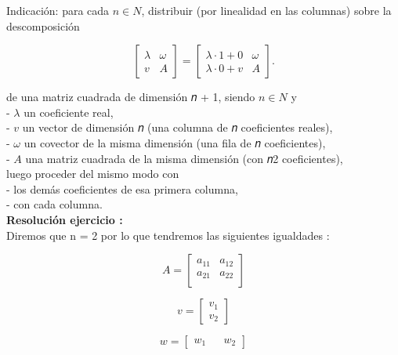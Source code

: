 \documentclass[11pt]{article}
\begin{document}
Indicación: para cada \(n ∈ N\), distribuir (por linealidad en las
columnas) sobre la descomposición

\begin{equation}
\begin{bmatrix}
\lambda & \omega \\
v & A
\end{bmatrix} = \begin{bmatrix}
\lambda \cdot 1 + 0 & \omega \\
\lambda \cdot 0 + v & A
\end{bmatrix}.
\end{equation}

de una matriz cuadrada de dimensión 𝑛 + 1, siendo \(n ∈ N\) y\\
- \(𝜆\) un coeficiente real,\\
- \(𝑣\) un vector de dimensión 𝑛 (una columna de 𝑛 coeficientes
reales),\\
- \(𝜔\) un covector de la misma dimensión (una fila de 𝑛
coeficientes),\\
- \(𝐴\) una matriz cuadrada de la misma dimensión (con 𝑛2
coeficientes),\\
luego proceder del mismo modo con\\
- los demás coeficientes de esa primera columna,\\
- con cada columna.\\

    \textbf{Resolución ejercicio :}\\
Diremos que n = 2 por lo que tendremos las siguientes igualdades :

\begin{equation}
A =
\begin{bmatrix}
a_{11} & a_{12} \\
a_{21} & a_{22} \\
\end{bmatrix}
\end{equation}

\begin{equation}
v =
\begin{bmatrix}
v_1 \\
v_2
\end{bmatrix}
\end{equation}

\begin{equation}
w =
\begin{bmatrix}
w_1 &&
w_2
\end{bmatrix}
\end{equation}
\end{document}
